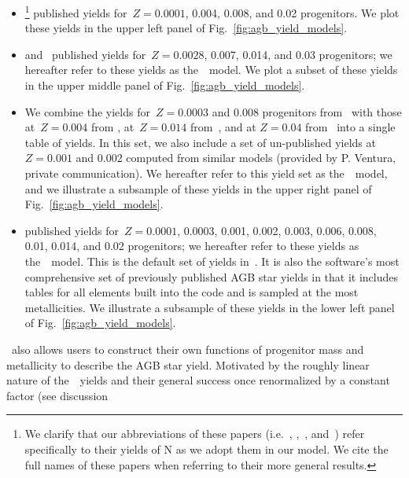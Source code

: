 \documentclass[ms.tex]{subfiles}
\begin{document}
\begin{itemize}
	\item[\textbf{1.}] \citet[][hereafter~\karakasten]{Karakas2010}\footnote{
		We clarify that our abbreviations of these papers (i.e.~\karakasten,
		\karakas,~\ventura, and~\cristallo) refer specifically to their yields
		of N as we adopt them in our model.
		We cite the full names of these papers when referring to their more
		general results.
	} published yields for~$Z = 0.0001$, 0.004, 0.008, and 0.02 progenitors.
	We plot these yields in the upper left panel of 
	Fig.~\ref{fig:agb_yield_models}.

	\item[\textbf{2.}] \citet{Karakas2016} and~\citet{Karakas2018} published
	yields for~$Z = 0.0028$, 0.007, 0.014, and 0.03 progenitors; we hereafter
	refer to these yields as the~\karakas~model.
	We plot a subset of these yields in the upper middle panel of
	Fig.~\ref{fig:agb_yield_models}.

	\item[\textbf{3.}] We combine the yields for~$Z = 0.0003$ and 0.008
	progenitors from~\citet{Ventura2013} with those at~$Z = 0.004$ from
	\citet{Ventura2014}, at~$Z = 0.014$ from~\citet{Ventura2018}, and at
	$Z = 0.04$ from~\citet{Ventura2020} into a single table of yields.
	In this set, we also include a set of un-published yields at~$Z = 0.001$
	and 0.002 computed from similar models (provided by P. Ventura, private
	communication).
	We hereafter refer to this yield set as the~\ventura~model, and we
	illustrate a subsample of these yields in the upper right panel of
	Fig.~\ref{fig:agb_yield_models}.

	\item[\textbf{4.}] \citet{Cristallo2011, Cristallo2015} published yields
	for~$Z = 0.0001$, 0.0003, 0.001, 0.002, 0.003, 0.006, 0.008, 0.01, 0.014,
	and 0.02 progenitors; we hereafter refer to these yields as
	the~\cristallo~model.
	This is the default set of yields in~\vice.
	It is also the software's most comprehensive set of previously published
	AGB star yields in that it includes tables for all elements built into the
	code and is sampled at the most metallicities.
	We illustrate a subsample of these yields in the lower left panel of
	Fig.~\ref{fig:agb_yield_models}.
\end{itemize}
\vice~also allows users to construct their own functions of progenitor mass
and metallicity to describe the AGB star yield.
Motivated by the roughly linear nature of the~\cristallo~yields and their
general success once renormalized by a constant factor (see discussion
\end{document}

